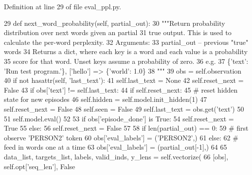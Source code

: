 Definition at line 29 of file eval\+\_\+ppl.\+py.


\begin{DoxyCode}
29     \textcolor{keyword}{def }next\_word\_probability(self, partial\_out):
30         \textcolor{stringliteral}{"""Return probability distribution over next words given an partial}
31 \textcolor{stringliteral}{        true output. This is used to calculate the per-word perplexity.}
32 \textcolor{stringliteral}{        Arguments:}
33 \textcolor{stringliteral}{        partial\_out -- previous "true" words}
34 \textcolor{stringliteral}{        Returns a dict, where each key is a word and each value is a probability}
35 \textcolor{stringliteral}{        score for that word. Unset keys assume a probability of zero.}
36 \textcolor{stringliteral}{        e.g.}
37 \textcolor{stringliteral}{        \{'text': 'Run test program.'\}, ['hello'] => \{'world': 1.0\}}
38 \textcolor{stringliteral}{        """}
39         obs = self.observation
40         \textcolor{keywordflow}{if} \textcolor{keywordflow}{not} hasattr(self, \textcolor{stringliteral}{'last\_text'}):
41             self.last\_text = \textcolor{keywordtype}{None}
42             self.reset\_next = \textcolor{keyword}{False}
43         \textcolor{keywordflow}{if} obs[\textcolor{stringliteral}{'text'}] != self.last\_text:
44             \textcolor{keywordflow}{if} self.reset\_next:
45                 \textcolor{comment}{# reset hidden state for new episodes}
46                 self.hidden = self.model.init\_hidden(1)
47                 self.reset\_next = \textcolor{keyword}{False}
48             self.seen = \textcolor{keyword}{False}
49             self.last\_text = obs.get(\textcolor{stringliteral}{'text'})
50 
51         self.model.eval()
52 
53         \textcolor{keywordflow}{if} obs[\textcolor{stringliteral}{'episode\_done'}] \textcolor{keywordflow}{is} \textcolor{keyword}{True}:
54             self.reset\_next = \textcolor{keyword}{True}
55         \textcolor{keywordflow}{else}:
56             self.reset\_next = \textcolor{keyword}{False}
57 
58         \textcolor{keywordflow}{if} len(partial\_out) == 0:
59             \textcolor{comment}{# first observe 'PERSON2' token}
60             obs[\textcolor{stringliteral}{'eval\_labels'}] = (\textcolor{stringliteral}{'PERSON2'},)
61         \textcolor{keywordflow}{else}:
62             \textcolor{comment}{# feed in words one at a time}
63             obs[\textcolor{stringliteral}{'eval\_labels'}] = (partial\_out[-1],)
64 
65         data\_list, targets\_list, labels, valid\_inds, y\_lens = self.vectorize(
66             [obs], self.opt[\textcolor{stringliteral}{'seq\_len'}], \textcolor{keyword}{False}

\end{DoxyCode}

